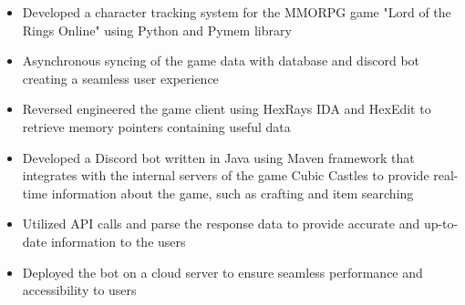 \documentclass[10pt,a4paper,ragged2e]{altacv}
\begin{document}
\begin{itemize}
\item Developed a character tracking system for the MMORPG game "Lord of the Rings Online" using Python and Pymem library
\item Asynchronous syncing of the game data with database and discord bot creating a seamless user experience
\item Reversed engineered the game client using HexRays IDA and HexEdit to retrieve memory pointers containing useful data
\end{itemize}

\divider

\begin{itemize}
\item Developed a Discord bot written in Java using Maven framework that integrates with the internal servers of the game Cubic Castles to provide real-time information about the game, such as crafting and item searching
\item Utilized API calls and parse the response data to provide accurate and up-to-date information to the users
\item Deployed the bot on a cloud server to ensure seamless performance and accessibility to users
\end{itemize}

\clearpage

% 
% 
% 
% 
% 
% 
% 
\end{document}
